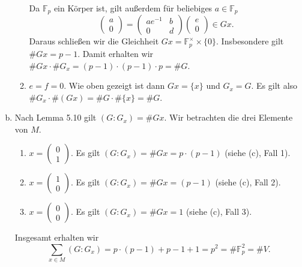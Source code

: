 \documentclass{article}
\begin{document}
\begin{enumerate}[(a)]
\begin{enumerate}[(1)]
                    Da $\mathbb{F}_p$ ein Körper ist, gilt außerdem für beliebiges $a\in \mathbb{F}_p$
                    \[
                        \begin{pmatrix}
                            a \\0
                        \end{pmatrix} = \begin{pmatrix}
                            ae^{-1} & b \\0&d
                        \end{pmatrix}\begin{pmatrix}
                            e \\0
                        \end{pmatrix} \in Gx.
                    \]
                    Daraus schließen wir die Gleichheit $Gx = \mathbb{F}_p^\times \times \{0\}$.
                    Insbesondere gilt $\# Gx = p-1$. Damit erhalten wir
                    $\# Gx \cdot \# G_x = (p-1) \cdot (p-1)\cdot p = \# G$.
              \item $e = f = 0$. Wie oben gezeigt ist dann $Gx = \{x\}$ und $G_x = G$.
                    Es gilt also $\# G_x \cdot \# (Gx) = \# G \cdot \# \{x\} = \# G$.
          \end{enumerate}
    \item Nach Lemma 5.10 gilt $(G \colon G_x) = \# Gx$. Wir betrachten die drei Elemente von $M$.
          \begin{enumerate}[(1)]
              \item $x = \begin{pmatrix}
                            0 \\1
                        \end{pmatrix}$. Es gilt $(G \colon G_x) = \# Gx = p\cdot (p-1)$ (siehe (c), Fall 1).
              \item $x = \begin{pmatrix}
                            1 \\0
                        \end{pmatrix}$. Es gilt $(G \colon G_x) = \# Gx = (p-1)$ (siehe (c), Fall 2).
              \item $x = \begin{pmatrix}
                            0 \\0
                        \end{pmatrix}$. Es gilt $(G \colon G_x) = \# Gx = 1$ (siehe (c), Fall 3).
          \end{enumerate}
          Insgesamt erhalten wir
          \[
              \sum_{x\in M} (G\colon G_x) = p \cdot (p-1) + p-1 + 1 = p^2 = \# \mathbb{F}_p^2 = \# V.
          \]
\end{enumerate}
\end{document}
